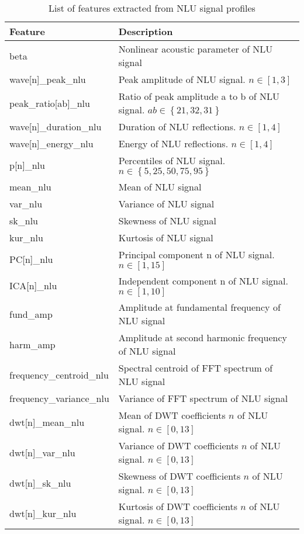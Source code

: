 \begin{table}
    \centering
    \caption{List of features extracted from NLU signal profiles}
    \label{table: nlu feature}
    \begin{tabularx}{\textwidth}{
      >{\arraybackslash\hsize=0.5\hsize}X
      >{\arraybackslash}X
    }
      \toprule
      Feature & Description \\
      \midrule
      beta & Nonlinear acoustic parameter of NLU signal \\
      wave[n]\_peak\_nlu & Peak amplitude of NLU signal. $n \in \left[ 1, 3 \right] $ \\
      peak\_ratio[ab]\_nlu & Ratio of peak amplitude a to b of NLU signal. $ab \in \left\{ 21, 32, 31 \right\} $ \\
      wave[n]\_duration\_nlu & Duration of NLU reflections. $n \in \left[ 1, 4 \right] $ \\
      wave[n]\_energy\_nlu & Energy of NLU reflections. $n \in \left[ 1, 4 \right] $ \\
      p[n]\_nlu & Percentiles of NLU signal. $n \in \left\{5, 25, 50, 75, 95 \right\}$ \\
      mean\_nlu & Mean of NLU signal \\
      var\_nlu & Variance of NLU signal \\
      sk\_nlu & Skewness of NLU signal \\
      kur\_nlu & Kurtosis of NLU signal \\
      PC[n]\_nlu & Principal component n of NLU signal. $n \in \left[ 1, 15 \right]$ \\
      ICA[n]\_nlu & Independent component n of NLU signal. $n \in \left[ 1, 10 \right]$ \\
      fund\_amp & Amplitude at fundamental frequency of NLU signal \\
      harm\_amp & Amplitude at second harmonic frequency of NLU signal \\
      frequency\_centroid\_nlu & Spectral centroid of FFT spectrum of NLU signal \\
      frequency\_variance\_nlu & Variance of FFT spectrum of NLU signal \\
      dwt[n]\_mean\_nlu & Mean of DWT coefficients $n$ of NLU signal. $n \in \left[ 0, 13 \right] $ \\
      dwt[n]\_var\_nlu & Variance of DWT coefficients $n$ of NLU signal. $n \in \left[ 0, 13 \right] $ \\
      dwt[n]\_sk\_nlu & Skewness of DWT coefficients $n$ of NLU signal. $n \in \left[ 0, 13 \right] $ \\
      dwt[n]\_kur\_nlu & Kurtosis of DWT coefficients $n$ of NLU signal. $n \in \left[ 0, 13 \right] $ \\
      \bottomrule
    \end{tabularx}
\end{table}